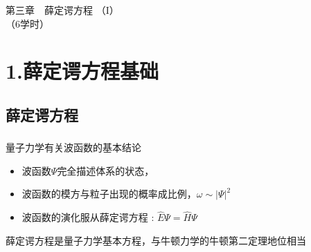 \begin{frame}
		\frametitle{}
		\Background[1] 
	    \begin{center}
		{ {\Huge 第三章~~薛定谔方程 （I）\\（6学时）}}
	    \end{center}    
\end{frame}

\section{1.薛定谔方程基础}
\subsection{薛定谔方程}
\begin{frame}
	\frametitle{}  
	\begin{block}	{量子力学有关波函数的基本结论}
	\begin{itemize}
		\item 	波函数$\Psi$完全描述体系的状态，
		\item 	波函数的模方与粒子出现的概率成比例，$\omega \sim |\Psi|^2$
		\item 	波函数的演化服从薛定谔方程 : $\hat{E} \Psi = \hat{H}  \Psi $ 
	\end{itemize}
	薛定谔方程是量子力学基本方程，与牛顿力学的牛顿第二定理地位相当
	\end{block}	
\end{frame}

